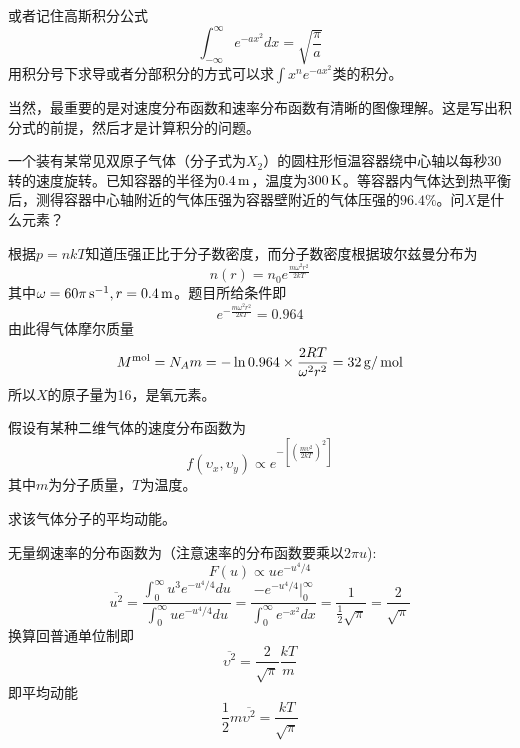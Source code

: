 \documentclass[CJK]{beamer}
\begin{document}
\begin{frame}
  \bch
      {\small
        或者记住高斯积分公式
        $$\int_{-\infty}^{\infty} e^{-ax^2}dx = \sqrt{\frac{\pi}{a}}$$
        用积分号下求导或者分部积分的方式可以求$\int x^n e^{-ax^2}$类的积分。
  }
  \ech
\end{frame}

\begin{frame}
  \bch
      {\small
        当然，最重要的是对速度分布函数和速率分布函数有清晰的图像理解。这是写出积分式的前提，然后才是计算积分的问题。
  }
  \ech
\end{frame}

\begin{frame}
  \chtitle{\proid (\stwo)}
  \bch
  一个装有某常见双原子气体（分子式为$X_2$）的圆柱形恒温容器绕中心轴以每秒$30$转的速度旋转。已知容器的半径为$0.4\,\mathrm{m}$，温度为$300\,\mathrm{K}$。等容器内气体达到热平衡后，测得容器中心轴附近的气体压强为容器壁附近的气体压强的$96.4\%$。问$X$是什么元素？
  \ech
\end{frame}

\begin{frame}
  \bch
  根据$p = nkT$知道压强正比于分子数密度，而分子数密度根据玻尔兹曼分布为
  $$ n(r) = n_0e^{\frac{m\omega^2 r^2}{2kT}}$$
  其中$\omega = 60\pi \,\mathrm{s}^{-1}, r= 0.4\,\mathrm{m}$。题目所给条件即
  $$e^{-\frac{m\omega^2 r^2}{2kT}}=0.964$$
  由此得气体摩尔质量
  $$ M^{\rm mol} = N_Am = -\ln 0.964\times \frac{2RT}{\omega^2r^2} = 32\,\mathrm{g}/\,\mathrm{mol}$$
  所以$X$的原子量为16，是氧元素。
  \ech
\end{frame}


\begin{frame}
  \chtitle{\proid (\sthree)}
  \bch
  假设有某种二维气体的速度分布函数为
  $$f(\upsilon_x,\upsilon_y)\propto e^{-\left[\left(\frac{m\upsilon^2}{2kT}\right)^2\right]}$$
  其中$m$为分子质量，$T$为温度。

  求该气体分子的平均动能。
  \ech
\end{frame}

\begin{frame}
  \bch
      {\small
        无量纲速率的分布函数为（注意速率的分布函数要乘以$2\pi u$):
        $$F(u) \propto u e^{-u^4/4}$$
$$        \overline{u^2} = \frac{\int_0^\infty u^3e^{-u^4/4}du}{\int_0^\infty ue^{-u^4/4}du} =      \frac{ -e^{-u^4/4}|_0^\infty }{\int_0^\infty e^{-x^2}dx} =\frac{1}{\frac{1}{2}\sqrt{\pi}} = \frac{2}{\sqrt{\pi}} $$
        换算回普通单位制即
        $$\overline{\upsilon^2} = \frac{2}{\sqrt{\pi}} \frac{kT}{m}$$
        即平均动能
        $$\frac{1}{2}m \overline{\upsilon^2} = \frac{kT}{\sqrt{\pi}}$$
  }
  \ech
\end{frame}
\end{document}
